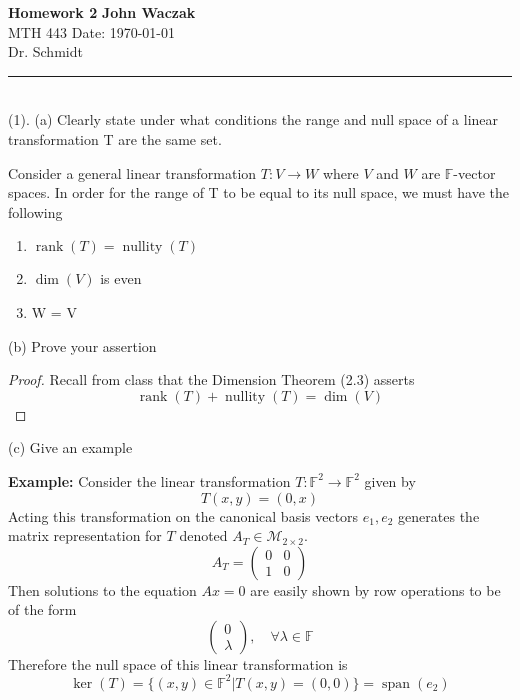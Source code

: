 \documentclass[a4paper, 11pt]{article}
\newcommand{\F}{\mathbb{F}}
\newenvironment{solution}{%
	\begin{list}{}{%
			\setlength{\topsep}{0pt}%
			\setlength{\leftmargin}{1.5cm}%
			\setlength{\rightmargin}{1.5cm}%
			\setlength{\listparindent}{\parindent}%
			\setlength{\itemindent}{\parindent}%
			\setlength{\parsep}{\parskip}%
		}%
		\item[]}{\end{list}}
\begin{document}
\noindent
\large\textbf{Homework 2} \hfill \textbf{John Waczak} \\
\normalsize MTH 443 \hfill  Date: \today \\
Dr. Schmidt
\par\noindent\rule{\textwidth}{0.4pt} \\

\noindent(1). (a) Clearly state under what conditions the range and null space of a linear transformation T are the same set. 
	\begin{solution}
		\noindent Consider a general linear transformation $T:V\to W$ where $V$ and $W$ are $\F$-vector spaces. In order for the range of T to be equal to its null space, we must have the following
			\begin{enumerate}
				\item $\operatorname{rank}(T) = \operatorname{nullity}(T)$
				\item $\dim(V)$ is even 
				\item W = V 
			\end{enumerate}
	\end{solution}

\noindent(b) Prove your assertion 
	\begin{solution}
		\begin{proof}
			Recall from class that the Dimension Theorem (2.3) asserts 
				\begin{equation*}
					\operatorname{rank}(T) + \operatorname{nullity}(T) = \dim(V) 
				\end{equation*}
		\end{proof}
	\end{solution} 
\noindent(c) Give an example
	\begin{solution}
		\noindent\textbf{Example:} Consider the linear transformation $T:\F^2\to\F^2$ given by
			\begin{equation*}
				T(x,y) = (0, x) 
			\end{equation*}
		Acting this transformation on the canonical basis vectors $e_1, e_2$ generates the matrix representation for $T$ denoted $A_T \in \mathcal{M}_{2\times2}$. 
			\begin{equation*}
				A_T = \begin{pmatrix}
					0 & 0 \\ 
					1 & 0 
				\end{pmatrix}
			\end{equation*}
		Then solutions to the equation $Ax=0$ are easily shown by row operations to be of the form
			\begin{equation*}
				\begin{pmatrix} 0 \\ \lambda \end{pmatrix}, \quad \forall \lambda\in\F
			\end{equation*}
		Therefore the null space of this linear transformation is
			\begin{equation*}
				\ker(T) = \{(x,y)\in \F^2| T(x,y) = (0,0)\} = \operatorname{span}(e_2)
			\end{equation*}
	\end{solution}
\end{document}
